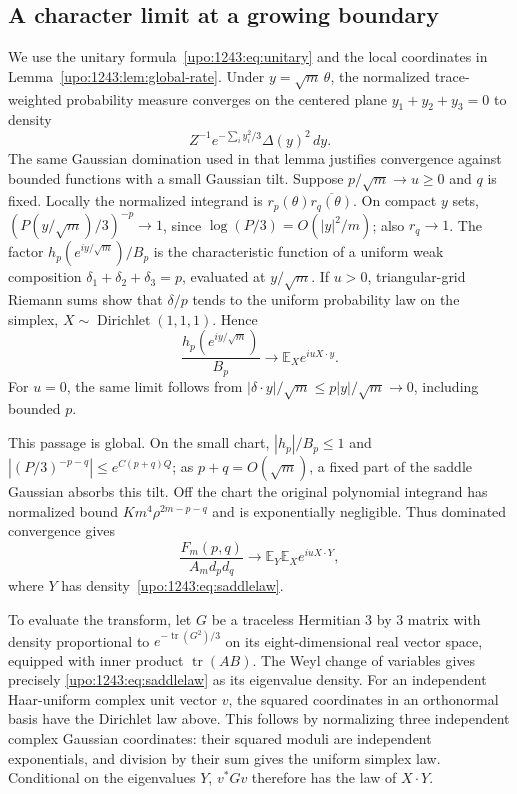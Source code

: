 \documentclass[11pt,letterpaper]{article}
\theoremstyle{remark}\newtheorem{remark}[theorem]{Remark}
\numberwithin{equation}{section}
\begin{document}
\subsection{A character limit at a growing boundary}
We use the unitary formula~\eqref{upo:1243:eq:unitary} and the local coordinates
in Lemma~\ref{upo:1243:lem:global-rate}. Under $y=\sqrt m\,\theta$, the normalized
trace-weighted probability measure converges on the centered plane
$y_1+y_2+y_3=0$ to density
\begin{equation}\label{upo:1243:eq:saddlelaw}
 Z^{-1}e^{-\sum_i y_i^2/3}\Delta(y)^2\,dy.
\end{equation}
The same Gaussian domination used in that lemma justifies convergence
against bounded functions with a small Gaussian tilt.
Suppose $p/\sqrt m\to u\ge0$ and $q$ is fixed. Locally the normalized
integrand is $r_p(\theta)\overline{r_q(\theta)}$.
On compact $y$ sets, $(P(y/\sqrt m)/3)^{-p}\to1$, since
$\log(P/3)=O(|y|^2/m)$; also $r_q\to1$.
The factor $h_p(e^{iy/\sqrt m})/B_p$ is the characteristic function of a
uniform weak composition $\delta_1+\delta_2+\delta_3=p$, evaluated at
$y/\sqrt m$. If $u>0$, triangular-grid Riemann sums show that
$\delta/p$ tends to the uniform probability law on the simplex,
$X\sim\operatorname{Dirichlet}(1,1,1)$. Hence
\[
 \frac{h_p(e^{iy/\sqrt m})}{B_p}
 \longrightarrow\mathbb E_X e^{iu X\cdot y}.
\]
For $u=0$, the same limit follows from
$|\delta\cdot y|/\sqrt m\le p|y|/\sqrt m\to0$, including bounded $p$.

This passage is global. On the small chart,
$|h_p|/B_p\le1$ and $|(P/3)^{-p-q}|\le e^{C(p+q)Q}$;
as $p+q=O(\sqrt m)$, a fixed part of the saddle Gaussian absorbs this
tilt. Off the chart the original polynomial integrand has normalized
bound $Km^4\rho^{2m-p-q}$ and is exponentially negligible.
Thus dominated convergence gives
\begin{equation}\label{upo:1243:eq:charactertransform}
 \frac{F_m(p,q)}{A_md_pd_q}
 \longrightarrow\mathbb E_Y\mathbb E_X e^{iu X\cdot Y},
\end{equation}
where $Y$ has density~\eqref{upo:1243:eq:saddlelaw}.

To evaluate the transform, let $G$ be a traceless Hermitian $3$ by $3$
matrix with density proportional to $e^{-\operatorname{tr}(G^2)/3}$
on its eight-dimensional real vector space, equipped with inner product
$\operatorname{tr}(AB)$. The Weyl change of variables gives precisely
\eqref{upo:1243:eq:saddlelaw} as its eigenvalue density. For an independent
Haar-uniform complex unit vector $v$, the squared coordinates in an
orthonormal basis have the Dirichlet law above. This follows by
normalizing three independent complex Gaussian coordinates: their
squared moduli are independent exponentials, and division by their sum
gives the uniform simplex law. Conditional on the eigenvalues $Y$,
$v^*Gv$ therefore has the law of $X\cdot Y$.
\end{document}
